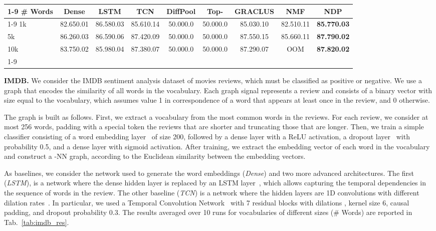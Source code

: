 \documentclass[journal]{IEEEtran}
\begin{document}
\begin{table*}
\centering
\setlength\tabcolsep{1em} \small
\bgroup
\def\arraystretch{1.25} \caption{Graph signal classification accuracy on IMDB sentiment analysis dataset.}
\begin{tabular}{lcccccccc}
\cmidrule[1.5pt]{1-9}
\textbf{\# Words} & \textbf{Dense} & \textbf{LSTM} & \textbf{TCN} & \textbf{DiffPool} & \textbf{Top-} & \textbf{GRACLUS} & \textbf{NMF} & \textbf{NDP} \\
\cmidrule[.5pt]{1-9}
1k  & 82.65{\tiny0.01} & 86.58{\tiny0.03} & 85.61{\tiny0.14} & 50.00{\tiny0.0} & 50.00{\tiny0.0} & 85.03{\tiny0.10} & 82.51{\tiny0.11} & \textbf{85.77{\tiny0.03}} \\ 5k  & 86.26{\tiny0.03} & 86.59{\tiny0.06} & 87.42{\tiny0.09} & 50.00{\tiny0.0} & 50.00{\tiny0.0} & 87.55{\tiny0.15} & 85.66{\tiny0.11} & \textbf{87.79{\tiny0.02}}\\ 10k & 83.75{\tiny0.02} & 85.98{\tiny0.04} & 87.38{\tiny0.07} & 50.00{\tiny0.0} & 50.00{\tiny0.0} & 87.29{\tiny0.07} & OOM & \textbf{87.82{\tiny0.02}} \\ \cmidrule[1.5pt]{1-9}
\end{tabular}
\label{tab:imdb_res}
\egroup
\end{table*}


\textbf{IMDB.} 
We consider the IMDB sentiment analysis dataset of movies reviews, which must be classified as positive or negative.
We use a graph that encodes the similarity of all words in the vocabulary. 
Each graph signal represents a review and consists of a binary vector with size equal to the vocabulary, which assumes value 1 in correspondence of a word that appears at least once in the review, and 0 otherwise.

The graph is built as follows.
First, we extract a vocabulary from the most common words in the reviews.
For each review, we consider at most 256 words, padding with a special token the reviews that are shorter and truncating those that are longer.
Then, we train a simple classifier consisting of a word embedding layer~\cite{mikolov2013distributed} of size 200, followed by a dense layer with a ReLU activation, a dropout layer~\cite{srivastava2014dropout} with probability 0.5, and a dense layer with sigmoid activation. 
After training, we extract the embedding vector of each word in the vocabulary and construct a -NN graph, according to the Euclidean similarity between the embedding vectors.

As baselines, we consider the network used to generate the word embeddings (\textit{Dense}) and two more advanced architectures.
The first (\textit{LSTM}), is a network where the dense hidden layer is replaced by an LSTM layer~\cite{hochreiter1997long}, which allows capturing the temporal dependencies in the sequence of words in the review.
The other baseline (\textit{TCN}) is a network where the hidden layers are 1D convolutions with different dilation rates~\cite{oord2016wavenet}.
In particular, we used a Temporal Convolution Network~\cite{bai2018empirical} with 7 residual blocks with dilations , kernel size 6, causal padding, and dropout probability 0.3.
The results averaged over 10 runs for vocabularies of different sizes (\# Words) are reported in Tab.~\ref{tab:imdb_res}.
\end{document}
